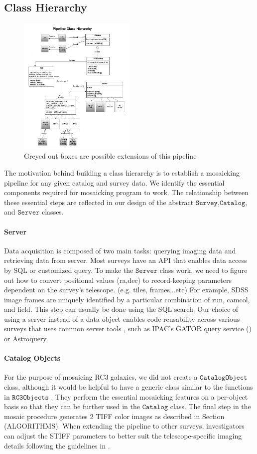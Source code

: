 \documentclass[5p]{elsarticle}
\begin{document}
	\subsection{Class Hierarchy}
	\begin{figure}[h]
		\includegraphics[width=0.5\textwidth]{figures/pipeline.jpg}
		\caption{Greyed out boxes are possible extensions of this pipeline}
	\end{figure}
 	The motivation behind building a class hierarchy is to establish a mosaicking pipeline for any given catalog and survey data. We identify the essential components required for mosaicking program to work. The relationship between these essential steps are reflected in our design of the abstract $\texttt{Survey}$,$\texttt{Catalog}$, and $\texttt{Server}$ classes. 
 		\paragraph{Server}
		Data acquisition is composed of two main tasks: querying imaging data and retrieving data from server. Most surveys have an API that enables data access by SQL or customized query. To make the $\texttt{Server}$ class work, we need to figure out how to convert positional values (ra,dec) to record-keeping parameters dependent on the survey's telescope. (e.g. tiles, frames...etc) For example, SDSS image frames are uniquely identified by a particular combination of  run, camcol, and field.  This step can usually be done using the SQL search. Our choice of using a server instead of a data object enables code reusability across various surveys that uses common server tools , such as IPAC's GATOR query service (\citet{irsa}) or  Astroquery.
	\paragraph{Catalog Objects}
	For the purpose of mosaicing RC3 galaxies, we did not create a $\texttt{CatalogObject}$ class, although it would be helpful to have a generic class similar to the functions in $\texttt{RC3Objects}$	. They perform the essential mosaicking features on a per-object basis so that they can be further used in the $\texttt{Catalog}$ class. The final step in the mosaic procedure generates 2 TIFF color images as described in Section (ALGORITHMS).  When extending the pipeline to other surveys, investigators can adjust the STIFF parameters to better suit the telescope-specific imaging details following the guidelines in \citet{stiff}.
\end{document}
